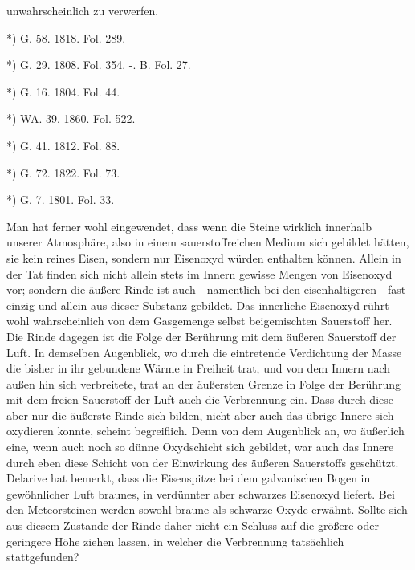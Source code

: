 \documentclass[a4paper, 8pt, oneside, polutonikogreek, german]{article}
\begin{document}
unwahrscheinlich zu verwerfen.

*) G. 58. 1818. Fol. 289.

*) G. 29. 1808. Fol. 354. -. B. Fol. 27.

*) G. 16. 1804. Fol. 44.

*) WA. 39. 1860. Fol. 522.

*) G. 41. 1812. Fol. 88.

*) G. 72. 1822. Fol. 73.

*) G. 7. 1801. Fol. 33.

Man hat ferner wohl eingewendet, dass wenn die Steine wirklich innerhalb unserer Atmosphäre, also in einem sauerstoffreichen Medium sich gebildet hätten, sie kein reines Eisen, sondern nur Eisenoxyd würden enthalten können. Allein in der Tat finden sich nicht allein stets im Innern gewisse Mengen von Eisenoxyd vor; sondern die äußere Rinde ist auch - namentlich bei den eisenhaltigeren - fast einzig und allein aus dieser Substanz gebildet. Das innerliche Eisenoxyd rührt wohl wahrscheinlich von dem Gasgemenge selbst beigemischten Sauerstoff her. Die Rinde dagegen ist die Folge der Berührung mit dem äußeren Sauerstoff der Luft. In demselben Augenblick, wo durch die eintretende Verdichtung der Masse die bisher in ihr gebundene Wärme in Freiheit trat, und von dem Innern nach außen hin sich verbreitete, trat an der äußersten Grenze in Folge der Berührung mit dem freien Sauerstoff der Luft auch die Verbrennung ein. Dass durch diese aber nur die äußerste Rinde sich bilden, nicht aber auch das übrige Innere sich oxydieren konnte, scheint begreiflich. Denn von dem Augenblick an, wo äußerlich eine, wenn auch noch so dünne Oxydschicht sich gebildet, war auch das Innere durch eben diese Schicht von der Einwirkung des äußeren Sauerstoffs geschützt. Delarive hat bemerkt, dass die Eisenspitze bei dem galvanischen Bogen in gewöhnlicher Luft braunes, in verdünnter aber schwarzes Eisenoxyd liefert. Bei den Meteorsteinen werden sowohl braune als schwarze Oxyde erwähnt. Sollte sich aus diesem Zustande der Rinde daher nicht ein Schluss auf die größere oder geringere Höhe ziehen lassen, in welcher die Verbrennung tatsächlich stattgefunden?
\end{document}
